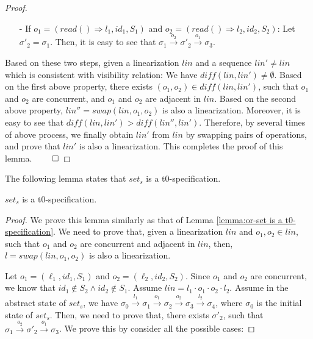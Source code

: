 {\begin {proof}
\begin{itemize}
\begin{itemize}
    \item[-] If $o_1 = (\mathit{read}() \Rightarrow l_1,\mathit{id}_1,S_1)$ and $o_2 = (\mathit{read}() \Rightarrow l_2,\mathit{id}_2,S_2)$: Let $\sigma'_2 = \sigma_1$. Then, it is easy to see that $\sigma_1 {\xrightarrow{o_2}} \sigma'_2 {\xrightarrow{o_1}} \sigma_3$.
    \end{itemize}
\end{itemize}

Based on these two steps, given a linearization $\mathit{lin}$ and a sequence $\mathit{lin}' \neq \mathit{lin}$ which is consistent with visibility relation: We have $\mathit{diff}(\mathit{lin},\mathit{lin}') \neq \emptyset$. Based on the first above property, there exists $(o_1,o_2) \in \mathit{diff}(\mathit{lin},\mathit{lin}')$, such that $o_1$ and $o_2$ are concurrent, and $o_1$ and $o_2$ are adjacent in $\mathit{lin}$. Based on the second above property, $\mathit{lin}'' = \mathit{swap}(\mathit{lin},o_1,o_2)$ is also a linearization. Moreover, it is easy to see that $\mathit{diff}(\mathit{lin},\mathit{lin}') > \mathit{diff}(\mathit{lin}'',\mathit{lin}')$. Therefore, by several times of above process, we finally obtain $\mathit{lin}'$ from $\mathit{lin}$ by swapping pairs of operations, and prove that $\mathit{lin}'$ is also a linearization. This completes the proof of this lemma. $\qed$
\end {proof}



The following lemma states that $\mathit{set}_s$ is a t0-specification.

\begin{lemma}
\label{lemma:set is a t0-specification}
$\mathit{set}_s$ is a t0-specification.
\end{lemma}

\begin {proof}

We prove this lemma similarly as that of Lemma \ref{lemma:or-set is a t0-specification}. We need to prove that, given a linearization $\mathit{lin}$ and $o_1,o_2 \in \mathit{lin}$, such that $o_1$ and $o_2$ are concurrent and adjacent in $\mathit{lin}$, then, $l = \mathit{swap}(\mathit{lin},o_1,o_2)$ is also a linearization.

Let $o_1 = (\ell_1,\mathit{id}_1,S_1)$ and $o_2 = (\ell_2,\mathit{id}_2,S_2)$. Since $o_1$ and $o_2$ are concurrent, we know that $\mathit{id}_1 \notin S_2 \wedge \mathit{id}_2 \notin S_1$. Assume $\mathit{lin} = l_1 \cdot o_1 \cdot o_2 \cdot l_2$. Assume in the abstract state of $\mathit{set}_s$, we have $\sigma_0 {\xrightarrow{l_1}} \sigma_1 {\xrightarrow{o_1}} \sigma_2 {\xrightarrow{o_2}} \sigma_3 {\xrightarrow{l_2}} \sigma_4$, where $\sigma_0$ is the initial state of $\mathit{set}_s$. Then, we need to prove that, there exists $\sigma'_2$, such that $\sigma_1 {\xrightarrow{o_2}} \sigma'_2 {\xrightarrow{o_1}} \sigma_3$. We prove this by consider all the possible cases:


\end{proof}}
